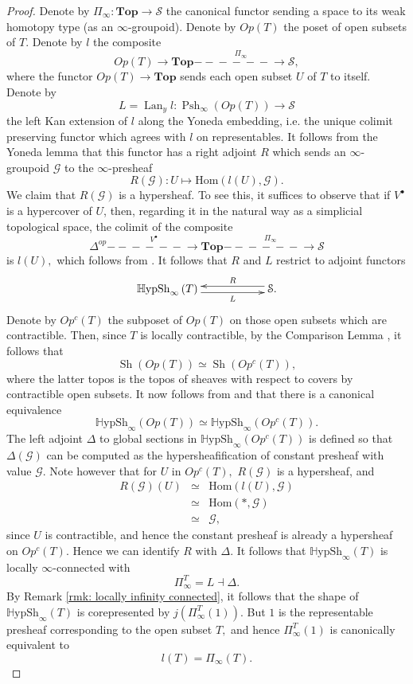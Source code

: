 \documentclass[12pt]{amsart}
\theoremstyle{definition}
\newcommand{\cG}{\mathcal{G}}
\newcommand{\cS}{\mathcal{S}}
\newcommand{\Sh}{\operatorname{Sh}}
\newcommand{\Hom}{\mathrm{Hom}}
\def\Top{\mathbf{Top}}
\renewcommand{\i}{\infty}
\def\Pshi{\operatorname{Psh}_\i}
\def\Hshi{\mathbb{H}\mathrm{ypSh}_\i}
\def\Lan{\operatorname{Lan}}
\def\Top{\mathbf{Top}}
\def\longlongrightarrow{-\!\!\!-\!\!\!-\!\!\!-\!\!\!-\!\!\!-\!\!\!\longrightarrow}
\begin{document}
\begin{proof}
Denote by $\Pi_\i:\Top \to \cS$ the canonical functor sending a space to its weak homotopy type (as an $\i$-groupoid). Denote by $Op\left(T\right)$ the poset of open subsets of $T.$ Denote by $l$ the composite
$$Op\left(T\right) \to \Top \stackrel{\Pi_\i}{\longlongrightarrow} \cS,$$ where the functor $Op\left(T\right) \to \Top$ sends each open subset $U$ of $T$ to itself. Denote by $$L=\Lan_y l:\Pshi\left(Op\left(T\right)\right) \to \cS$$ the left Kan extension of $l$ along the Yoneda embedding, i.e. the unique colimit preserving functor which agrees with $l$ on representables. It follows from the Yoneda lemma that this functor has a right adjoint $R$ which sends an $\i$-groupoid $\cG$ to the $\i$-presheaf $$R\left(\cG\right):U \mapsto \Hom\left(l\left(U\right),\cG\right).$$ We claim that $R\left(\cG\right)$ is a hypersheaf. To see this, it suffices to observe that if $V^{\bullet}$ is a hypercover of $U$, then, regarding it in the natural way as a simplicial topological space, the colimit of the composite $$\Delta^{op} \stackrel{V^\bullet}{\longlongrightarrow} \Top \stackrel{\Pi_\i}{\longlongrightarrow} \cS$$ is $l\left(U\right),$ which follows from \cite[Theorem 1.3]{duggerisaksen}. It follows that $R$ and $L$ restrict to adjoint functors
$$\xymatrix@C=2cm{\Hshi\left(T\right) \ar@<-0.65ex>[r]_-{L} & \cS. \ar@<-0.65ex>[l]_-{R}}$$ Denote by $Op^c\left(T\right)$ the subposet of $Op\left(T\right)$ on those open subsets which are contractible. Then, since $T$ is locally contractible, by the Comparison Lemma \cite[III]{SGA4}, it follows that $$\Sh\left(Op\left(T\right)\right)\simeq \Sh\left(Op^c\left(T\right)\right),$$ where the latter topos is the topos of sheaves with respect to covers by contractible open subsets. It now follows from \cite[Theorem 5]{Jardine} and \cite[Proposition 6.5.2.14]{htt} that there is a canonical equivalence $$\Hshi\left(Op\left(T\right)\right)\simeq \Hshi\left(Op^c\left(T\right)\right).$$ The left adjoint $\Delta$ to global sections in $\Hshi\left(Op^c\left(T\right)\right)$ is defined so that $\Delta\left(\cG\right)$ can be computed as the hypersheafification of constant presheaf with value $\cG.$ Note however that for $U$ in $Op^c\left(T\right),$ $R\left(\cG\right)$ is a hypersheaf, and
\begin{eqnarray*}
R\left(\cG\right)\left(U\right) &\simeq& \Hom\left(l\left(U\right),\cG\right)\\
&\simeq& \Hom\left(*,\cG\right)\\
&\simeq& \cG,
\end{eqnarray*}
since $U$ is contractible, and hence the constant presheaf is already a hypersheaf on $Op^c\left(T\right).$ Hence we can identify $R$ with $\Delta.$ It follows that $\Hshi\left(T\right)$ is locally $\i$-connected with $$\Pi^{T}_\i=L \dashv \Delta.$$ By Remark \ref{rmk: locally infinity connected}, it follows that the shape of $\Hshi\left(T\right)$ is corepresented by $j\left(\Pi^{T}_\i\left(1\right)\right).$ But $1$ is the representable presheaf corresponding to the open subset $T,$ and hence $\Pi^{T}_\i\left(1\right)$ is canonically equivalent to $$l\left(T\right)=\Pi_\i\left(T\right).$$
\end{proof}
\end{document}
